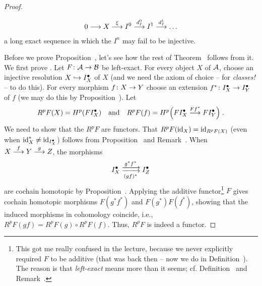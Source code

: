 \documentclass[a4paper,parskip=half,numbers=enddot, DIV=12]{scrreprt}
\begin{document}
\begin{proof}
\begin{rem}
\begin{alphanumerate}
\begin{align*}
					0\morphism X\morphism[\xi]I^0\morphism[d_I^0]I^1\morphism[d_I^1]\ldots 
				\end{align*}
				a long exact sequence in which the $I^n$ may fail to be injective. 
			\end{alphanumerate}
		\end{rem}
		Before we prove Proposition~, let's see how the rest of Theorem~ follows from it. We first prove . Let $F\colon\Aa\morphism \Bb$ be left-exact. For every object $X$ of $\mathcal{A}$, choose an injective resolution $X\monomorphism I_X^\bullet $ of $X$ (and we need the axiom of choice -- for \emph{classes!} -- to do this). For every morphism $f\colon X\morphism Y$ choose an extension $f^*\colon I_X^\bullet \morphism I_Y^\bullet $ of $f$ (we may do this by Proposition~). Let
		\begin{align*}
			R^pF(X)=H^p(FI_X^\bullet )\quad\text{and}\quad R^pF(f)=H^p\Big(FI_X^\bullet \morphism[Ff^* ]FI_Y^\bullet \Big)\;.
		\end{align*}
		We need to show that the $R^pF$ are functors. That $R^pF(\operatorname{id}_X)=\operatorname{id}_{R^pF(X)}$ (even when $\operatorname{id}_X^* \neq \operatorname{id}_{I_X^\bullet }$) follows from Proposition~ and Remark~. When $X\morphism[f]Y\morphism[g]Z$, the morphisms 
		\begin{align*}
			I_X^\bullet \xdoublemorphism[g^* f^* ][(gf)^* ]I_Z^\bullet 
		\end{align*}
		are cochain homotopic by Proposition~. Applying the additive functor\footnote{This got me really confused in the lecture, because we never explicitly required $F$ to be additive (that was back then -- now we do in Definition~). The reason is that \emph{left-exact} means more than it seems; cf. Definition~ and Remark~.} $F$ gives cochain homotopic morphisms $F(g^* f^* )$ and $F(g^* )F(f^*)$, showing that the induced morphisms in cohomology coincide, i.e., $R^pF(gf)=R^pF(g)\circ R^pF(f)$. Thus, $R^pF$ is indeed a functor.
		

\end{proof}
\end{document}
